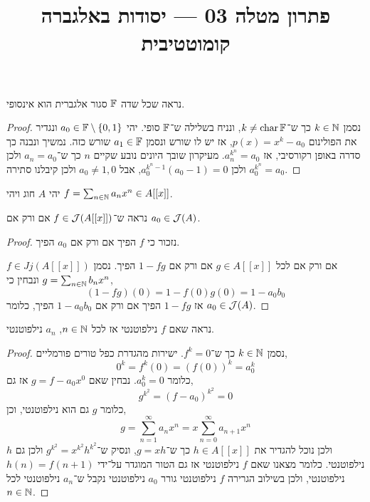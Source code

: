 
\title{פתרון מטלה 03 --- יסודות באלגברה קומוטטיבית}

\DeclareMathOperator{\Spec}{Spec}
\DeclareMathOperator{\Specm}{Specm}
\DeclareMathOperator{\Nil}{Nil}


\maketitle
\maketitleprint[red]

\question{}
נראה שכל שדה $\mathbb{F}$ סגור אלגברית הוא אינסופי.
\begin{proof}
	נסמן $k \in \mathbb{N}$ כך ש־$k \ne \operatorname{char} \mathbb{F}$, ונניח בשלילה ש־$\mathbb{F}$ סופי.
	יהי $a_0 \in \mathbb{F} \setminus \{ 0, 1 \}$ ונגדיר את הפולינום $p(x) = x^k - a_0$, אז יש לו שורש ונסמן $a_1 \in \mathbb{F}$ שורש כזה.
	נמשיך ונבנה כך סדרה באופן רקורסיבי, אז $a_{n}^{k^n} = a_0$.
	מעיקרון שובך היונים נובע שקיים $n$ כך ש־$a_n = a_0$ ולכן $a_0^{k^n} = a_0$ ולכן $a_0^{k^n - 1} (a_0 - 1) = 0$, אבל $a_0 \ne 1, 0$ ולכן קיבלנו סתירה.
\end{proof}

\question{}
יהי $A$ חוג ויהי $f = \sum_{n \in \mathbb{N}} a_n x^n \in A[[x]]$.

\subquestion{}
נראה ש־$f \in \mathcal{J}(A[[x]])$ אם ורק אם $a_0 \in \mathcal{J}(A)$.
\begin{proof}
	נזכור כי $f$ הפיך אם ורק אם $a_0$ הפיך.

	$f \in Jj(A[[x]])$ אם ורק אם לכל $g \in A[[x]]$ אם ורק אם $1 - f g$ הפיך.
	נסמן $g = \sum_{n \in \mathbb{N}} b_n x^n$ ונבחין כי,
	\[
		(1 - f g)(0)
		= 1 - f(0) g(0)
		= 1 - a_0 b_0
	\]
	אז $1 - f g$ הפיך אם ורק אם $1 - a_0 b_0$ הפיך, כלומר $a_0 \in \mathcal{J}(A)$.
\end{proof}

\subquestion{}
נראה שאם $f$ נילפוטנטי אז לכל $n \in \mathbb{N}$, $a_n$ נילפוטנטי.
\begin{proof}
	נסמן $k \in \mathbb{N}$ כך ש־$f^k = 0$.
	ישירות מהגדרת כפל טורים פורמליים,
	\[
		0^k
		= f^k(0)
		= {(f(0))}^k
		= a_0^k
	\]
	כלומר $a_0^k = 0$.
	נבחין שאם $g = f - a_0 x^0$ אז גם,
	\[
		g^{k^2}
		= {(f - a_0)}^{k^2}
		= 0
	\]
	כלומר $g$ גם הוא נילפוטנטי, וכן,
	\[
		g
		= \sum_{n = 1}^\infty a_n x^n
		= x \sum_{n = 0}^\infty a_{n + 1} x^n
	\]
	ולכן נוכל להגדיר את $h \in A[[x]]$ כך ש־$g = x h$, ונסיק ש־$g^{k^2} = x^{k^2} h^{k^2}$ ולכן גם $h$ נילפוטנטי.
	כלומר מצאנו שאם $f$ נילפוטנטי אז גם הטור המוגדר על־ידי $h(n) = f(n + 1)$ נילפוטנטי, ולכן בשילוב הגרירה $f$ נילפוטנטי גורר $a_0$ נילפוטנטי נקבל ש־$a_n$ נילפוטנטי לכל $n \in \mathbb{N}$.
\end{proof}

